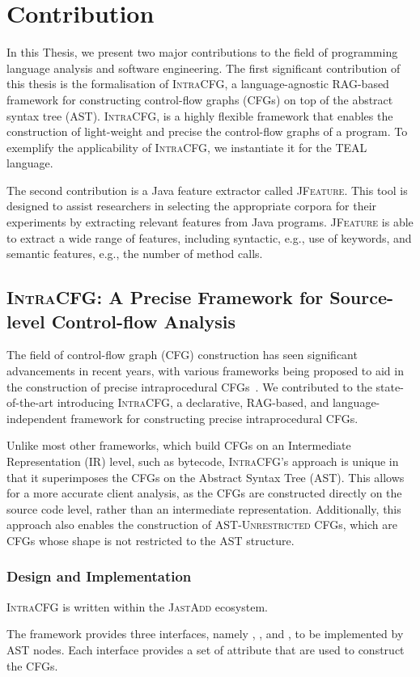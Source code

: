 \section{Contribution}
\label{sec:contribution}
In this Thesis, we present two major contributions to the field of programming 
language analysis and software engineering. 
The first significant contribution of this thesis is the formalisation of \textsc{IntraCFG},
a language-agnostic RAG-based framework for constructing control-flow graphs (CFGs) 
on top of the abstract syntax tree (AST). \textsc{IntraCFG}, is a highly flexible
framework that enables the construction of light-weight and precise the control-flow graphs
of a program. To exemplify the applicability of \textsc{IntraCFG}, we instantiate it for the TEAL language.

The second contribution is a Java feature extractor called \textsc{JFeature}.
This tool is designed to assist researchers in selecting the appropriate corpora
for their experiments by extracting relevant features from Java programs. 
\textsc{JFeature} is able to extract a wide range of features, 
including syntactic, e.g., use of keywords, and semantic features, e.g.,
the number of method calls.


\subsection{\textsc{IntraCFG}: A Precise Framework for Source-level Control-flow Analysis}
The field of control-flow graph (CFG) construction has seen significant advancements
in recent years, with various frameworks being proposed to aid in the construction 
of precise intraprocedural CFGs~\cite{smits2020flowspec,10.1016/j.scico.2012.02.002}.
We contributed to the state-of-the-art introducing \textsc{IntraCFG}, a declarative, RAG-based,
and language-independent framework for constructing precise intraprocedural CFGs.

Unlike most other frameworks, which build CFGs on an Intermediate Representation (IR) level,
such as bytecode, \textsc{IntraCFG}'s approach is unique in that it superimposes the CFGs 
on the Abstract Syntax Tree (AST). This allows for a more accurate client analysis,
as the CFGs are constructed directly on the source code level, rather than an
intermediate representation. Additionally, this approach also enables the construction 
of \textsc{AST-Unrestricted} CFGs, which are CFGs whose shape is not restricted to the AST structure.

\subsubsection*{Design and Implementation}
\textsc{IntraCFG} is written within the \textsc{JastAdd} ecosystem.

The framework provides three interfaces, namely , , and ,
to be implemented by AST nodes. Each interface provides a set of attribute that are used to construct
the CFGs.
 

